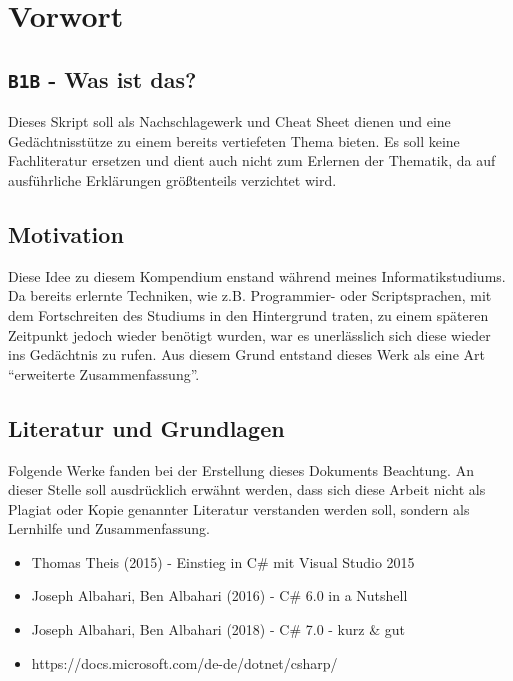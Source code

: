 \chapter{Vorwort}
\section{\texttt{B1B} - Was ist das?}
Dieses Skript soll als Nachschlagewerk und Cheat Sheet dienen und eine Gedächtnisstütze zu einem bereits vertiefeten Thema bieten. Es soll keine Fachliteratur ersetzen und dient auch nicht zum Erlernen der Thematik, da auf ausführliche Erklärungen größtenteils verzichtet wird.
\section{Motivation}
Diese Idee zu diesem Kompendium enstand während meines Informatikstudiums. Da bereits erlernte Techniken, wie z.B. Programmier- oder Scriptsprachen, mit dem Fortschreiten des Studiums in den Hintergrund traten, zu einem späteren Zeitpunkt jedoch wieder benötigt wurden, war es unerlässlich sich diese wieder ins Gedächtnis zu rufen. Aus diesem Grund entstand dieses Werk als eine Art ``erweiterte Zusammenfassung''.
\section{Literatur und Grundlagen}
Folgende Werke fanden bei der Erstellung dieses Dokuments Beachtung. An dieser Stelle soll ausdrücklich erwähnt werden, dass sich diese Arbeit nicht als Plagiat oder Kopie genannter Literatur verstanden werden soll, sondern als Lernhilfe und Zusammenfassung.
\begin{itemize}
\item Thomas Theis (2015) - Einstieg in C\# mit Visual Studio 2015
\item Joseph Albahari, Ben Albahari (2016) - C\# 6.0 in a Nutshell
\item Joseph Albahari, Ben Albahari (2018) - C\# 7.0 - kurz \& gut
\item https://docs.microsoft.com/de-de/dotnet/csharp/
\end{itemize}
